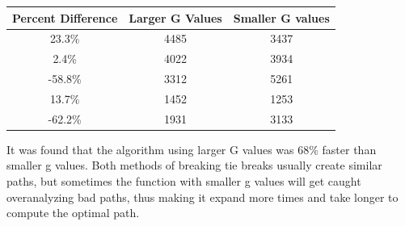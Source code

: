 \documentclass{article}
\begin{document}
\begin{center}
	\begin{tabular}{|c|c|c|}
		\hline
		Percent Difference & Larger G Values & Smaller G values \\
		\hline
		23.3\% & 4485 & 3437 \\
		2.4\% & 4022 & 3934 \\
		-58.8\% & 3312 & 5261 \\
		13.7\% & 1452 & 1253 \\
		-62.2\% & 1931 & 3133 \\
		\hline
	\end{tabular}
\end{center}

It was found that the algorithm using larger G values was  68\% faster than smaller g values. Both methods of breaking tie breaks usually create similar paths, but sometimes the function with smaller g values will get caught overanalyzing bad paths, thus making it expand more times and take longer to compute the optimal path. 
\end{document}
